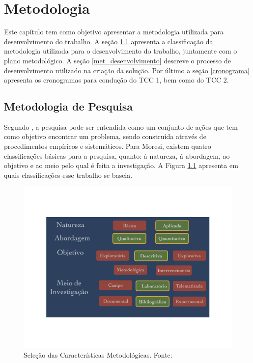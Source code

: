 \chapter[Metodologia]{Metodologia}
Este capítulo tem como objetivo apresentar a metodologia utilizada para desenvolvimento do trabalho. A seção \ref{met_pesquisa} apresenta a classificação da metodologia utilizada para o desenvolvimento do trabalho, juntamente com o plano metodológico. A seção \ref{met_desenvolvimento} descreve o processo de desenvolvimento utilizado na criação da solução. Por último a seção  \ref{cronograma} apresenta os cronogramas para condução do TCC 1, bem como do TCC 2.
\section{Metodologia de Pesquisa}
\label{met_pesquisa}
Segundo \cite{moresi_metodologia_2003}, a pesquisa pode ser entendida como um conjunto de ações que tem como objetivo encontrar um problema, sendo construída através de procedimentos empíricos e sistemáticos. Para Moresi, existem quatro classificações básicas para a pesquisa, quanto: à natureza, à abordagem, ao objetivo e ao meio pelo qual é feita a investigação. A Figura \ref{img:met_pesquisa} apresenta em quais classificações esse trabalho se baseia.
\graphicspath{{figuras/}}
\begin{figure}[h!]
\centering
\includegraphics[scale=0.50]{metodologia_pesquisa}
\caption{Seleção das Características Metodológicas. Fonte: \cite{moresi_metodologia_2003}}
\label{img:met_pesquisa}
\end{figure}

